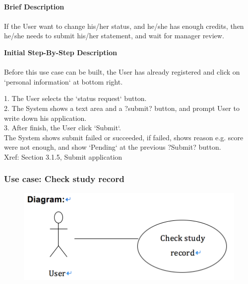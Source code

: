 \documentclass[12pt]{report}
\begin{document}
\paragraph{}
\begin{flushleft}
\textbf{Brief Description }
\paragraph{}
If the User want to change his/her status, and he/she has enough credits, then he/she needs to submit his/her statement, and wait for manager review. \\

\begin{flushleft}
\textbf{Initial Step-By-Step Description }
\paragraph{}
Before this use case can be built, the User has already registered and click on `personal information` at bottom right.

\begin{flushleft}
1.	 The User selects the `status request`  button. \\
2.	The System shows a text area and a ?submit? button, and prompt User to write down his application. \\
3.	After finish, the User click `Submit`. \\
The System shows submit failed or succeeded, if failed, shows reason e.g. score were not enough, and show `Pending` at the previous ?Submit? button. \\
Xref: Section 3.1.5, Submit application
\end{flushleft}
\end{flushleft}
\end{flushleft}


\newpage
\subsubsection{Use case:  Check study record}

\begin{figure}[!htb]
  \includegraphics{6.PNG}
\end{figure}
\end{document}
